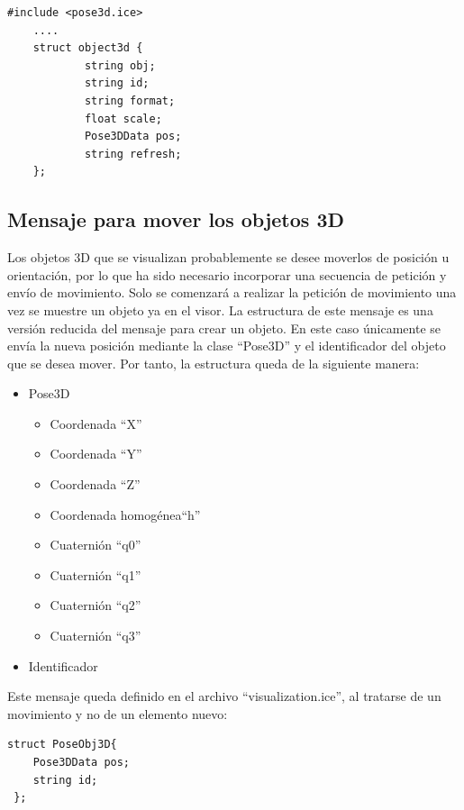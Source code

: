\begin{lstlisting}[caption= Definición de la estructura del objeto 3D con Slice, label=cod.obj3dslice]
#include <pose3d.ice>
	....
  	struct object3d {
    		string obj;
    		string id;
    		string format;
    		float scale;
    		Pose3DData pos;
    		string refresh;
  	};

 \end{lstlisting}


\subsection{Mensaje para mover los objetos 3D}
Los objetos 3D que se visualizan probablemente se desee moverlos de posición u orientación,  por lo que ha sido necesario incorporar una secuencia de petición y envío de movimiento. Solo se comenzará a realizar la petición de movimiento una vez se muestre un objeto ya en el visor. La estructura de este mensaje es una versión reducida del mensaje para crear un objeto. En este caso únicamente se envía la nueva posición mediante la clase ``Pose3D'' y el identificador del objeto que se desea mover. Por tanto, la estructura queda de la siguiente manera:
\begin{itemize}
	\item	Pose3D
	\begin{itemize}
		\item Coordenada ``X''
		\item Coordenada ``Y''
		\item Coordenada ``Z''
		\item Coordenada homogénea``h''
		\item Cuaternión ``q0''
		\item Cuaternión ``q1''
		\item Cuaternión ``q2''
		\item Cuaternión ``q3''
	\end{itemize}
	\item Identificador
\end{itemize}

Este mensaje queda definido en el archivo ``visualization.ice'', al tratarse de un movimiento y no de un elemento nuevo:

\begin{lstlisting}[caption= Definición de la estructura del movimiento de los objetos 3D con Slice, label=cod.movimientoslice]
struct PoseObj3D{
	Pose3DData pos;
	string id;
 };
\end{lstlisting}

